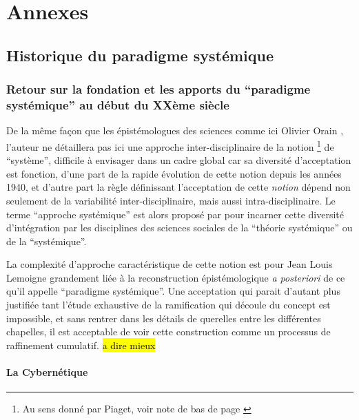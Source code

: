 
\graphicspath{{FigureAnnexe/}}

\part{Annexes}

\appendix

\chapter{Historique du paradigme systémique}

\section{Retour sur la fondation et les apports du \enquote{paradigme systémique} au début du XXème siècle}
\label{ssec:systemique}

De la même façon que les épistémologues des sciences comme ici Olivier Orain \autocite{Orain2001}, l'auteur ne détaillera pas ici une approche inter-disciplinaire de la notion \footnote{Au sens donné par Piaget, voir note de bas de page \autocite {Orain2001}} de \enquote{système}, difficile à envisager dans un cadre global car sa diversité d'acceptation est fonction, d'une part de la rapide évolution de cette notion depuis les années 1940, et d'autre part la règle définissant l'acceptation de cette \textit{notion} dépend non seulement de la variabilité inter-disciplinaire, mais aussi intra-disciplinaire. Le terme \enquote{approche systémique} est alors proposé par \autocite{Orain2001} pour incarner cette diversité d'intégration par les disciplines des sciences sociales de la \enquote{théorie systémique} ou de la \enquote{systémique}.

La complexité d'approche caractéristique de cette notion est pour Jean Louis Lemoigne grandement liée à la reconstruction épistémologique \textit{a posteriori} de ce qu'il appelle \enquote{paradigme systémique}. Une acceptation qui parait d'autant plus justifiée tant l'étude exhaustive de la ramification qui découle du concept est impossible, et sans rentrer dans les détails de querelles entre les différentes chapelles, il est acceptable de voir cette construction comme un processus de raffinement cumulatif. \hl{a dire mieux}

\subsection{La Cybernétique}
\label{ssubsec:cybernetic}


